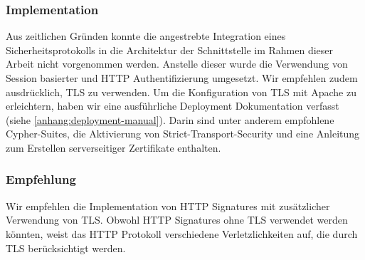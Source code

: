 \subsubsection{Implementation} Aus zeitlichen Gründen konnte die angestrebte
Integration eines Sicherheitsprotokolls in die Architektur der Schnittstelle im
Rahmen dieser Arbeit nicht vorgenommen werden. Anstelle dieser wurde die
Verwendung von Session basierter und HTTP Authentifizierung umgesetzt. Wir
empfehlen zudem ausdrücklich, TLS zu verwenden. Um die Konfiguration von TLS mit
Apache zu erleichtern, haben wir eine ausführliche Deployment Dokumentation
verfasst (siehe \ref{anhang:deployment-manual}). Darin sind unter anderem
empfohlene Cypher-Suites, die Aktivierung von Strict-Transport-Security und eine
Anleitung zum Erstellen serverseitiger Zertifikate enthalten.

\subsubsection{Empfehlung} Wir empfehlen die Implementation von HTTP Signatures mit
zusätzlicher Verwendung von TLS. Obwohl HTTP Signatures ohne TLS verwendet
werden könnten, weist das HTTP Protokoll verschiedene Verletzlichkeiten
\cite{httpsecconsiderations2014} auf, die durch TLS berücksichtigt werden.
